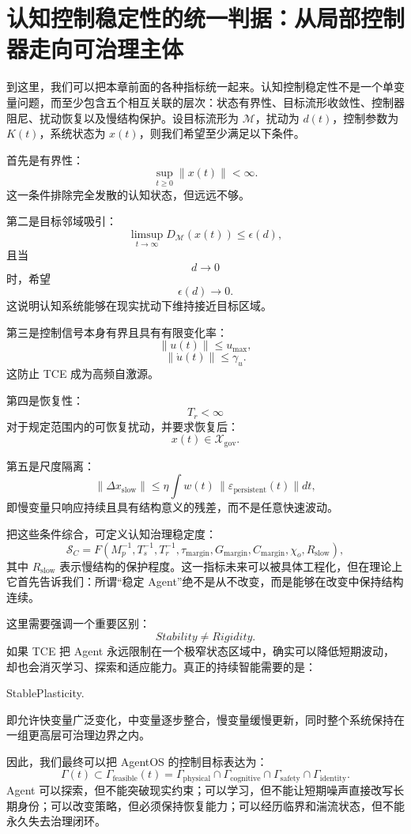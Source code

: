 \section{认知控制稳定性的统一判据：从局部控制器走向可治理主体}

到这里，我们可以把本章前面的各种指标统一起来。认知控制稳定性不是一个单变量问题，而至少包含五个相互关联的层次：状态有界性、目标流形收敛性、控制器阻尼、扰动恢复以及慢结构保护。设目标流形为 $\mathcal M$，扰动为 $d(t)$，控制参数为 $K(t)$，系统状态为 $x(t)$，则我们希望至少满足以下条件。

首先是有界性：
\[
\sup_{t\ge0}\|x(t)\|<\infty.
\]
这一条件排除完全发散的认知状态，但远远不够。

第二是目标邻域吸引：
\[
\limsup_{t\to\infty}
D_{\mathcal M}(x(t))
\le
\epsilon(d),
\]
且当
\[
d\to0
\]
时，希望
\[
\epsilon(d)\to0.
\]
这说明认知系统能够在现实扰动下维持接近目标区域。

第三是控制信号本身有界且具有有限变化率：
\[
\|u(t)\|
\le
u_{\max},
\]
\[
\|\dot u(t)\|
\le
\gamma_u.
\]
这防止 TCE 成为高频自激源。

第四是恢复性：
\[
T_r<\infty
\]
对于规定范围内的可恢复扰动，并要求恢复后：
\[
x(t)
\in
\mathcal X_{\mathrm{gov}}.
\]

第五是尺度隔离：
\[
\|\Delta x_{\mathrm{slow}}\|
\le
\eta
\int
w(t)\,
\|\varepsilon_{\mathrm{persistent}}(t)\|dt,
\]
即慢变量只响应持续且具有结构意义的残差，而不是任意快速波动。

把这些条件综合，可定义认知治理稳定度：
\[
\mathcal S_C
=
F
\left(
M_p^{-1},
T_s^{-1},
T_r^{-1},
\tau_{\mathrm{margin}},
G_{\mathrm{margin}},
C_{\mathrm{margin}},
\chi_o,
R_{\mathrm{slow}}
\right),
\]
其中 $R_{\mathrm{slow}}$ 表示慢结构的保护程度。这一指标未来可以被具体工程化，但在理论上它首先告诉我们：所谓“稳定 Agent”绝不是从不改变，而是能够在改变中保持结构连续。

这里需要强调一个重要区别：
\[
\boxed{
Stability
\neq
Rigidity.
}
\]
如果 TCE 把 Agent 永远限制在一个极窄状态区域中，确实可以降低短期波动，却也会消灭学习、探索和适应能力。真正的持续智能需要的是：
\begin{statementbox}
StablePlasticity.
\end{statementbox}
即允许快变量广泛变化，中变量逐步整合，慢变量缓慢更新，同时整个系统保持在一组更高层可治理边界之内。

因此，我们最终可以把 AgentOS 的控制目标表达为：
\[
\boxed{
\Gamma(t)
\subset
\Gamma_{\mathrm{feasible}}(t)
=
\Gamma_{\mathrm{physical}}
\cap
\Gamma_{\mathrm{cognitive}}
\cap
\Gamma_{\mathrm{safety}}
\cap
\Gamma_{\mathrm{identity}}.
}
\]
Agent 可以探索，但不能突破现实约束；可以学习，但不能让短期噪声直接改写长期身份；可以改变策略，但必须保持恢复能力；可以经历临界和湍流状态，但不能永久失去治理闭环。

